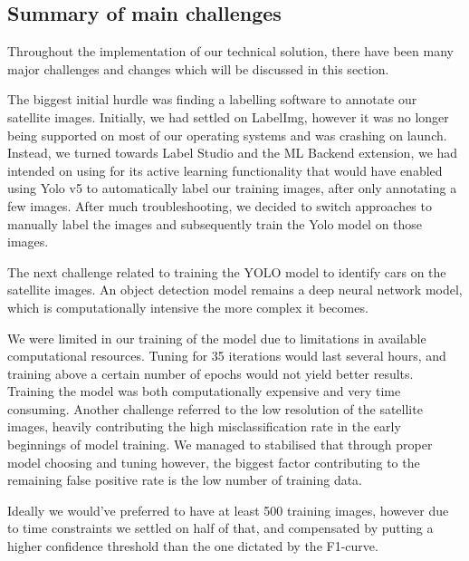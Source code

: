 \subsection{Summary of main challenges}
Throughout the implementation of our technical solution, there have been many
major challenges and changes which will be discussed in this section.


The biggest initial hurdle was finding a labelling software to annotate our
satellite images. Initially, we had settled on LabelImg, however it was no
longer being supported on most of our operating systems and was crashing on
launch. Instead, we turned towards Label Studio and the ML Backend extension, we
had intended on using for its active learning functionality that would have
enabled using Yolo v5 to automatically label our training images, after only
annotating a few images. After much troubleshooting, we decided to switch
approaches to manually label the images and subsequently train the Yolo model on
those images.

The next challenge related to training the YOLO model to identify cars on the
satellite images. An object detection model remains a deep neural network model,
which is computationally intensive the more complex it becomes.

We were limited in our training of the model due to limitations in available
computational resources. Tuning for 35 iterations would last several hours, and
training above a certain number of epochs would not yield better results.
Training the model was both computationally expensive and very time consuming.
Another challenge referred to the low resolution of the satellite images,
heavily contributing the high misclassification rate in the early beginnings of
model training. We managed to stabilised that through proper model choosing and
tuning however, the biggest factor contributing to the remaining false positive
rate is the low number of training data.

Ideally we would've preferred to have at least 500 training images, however due
to time constraints we settled on half of that, and compensated by putting a
higher confidence threshold than the one dictated by the F1-curve.

